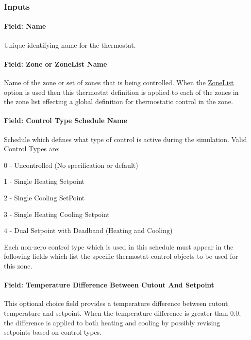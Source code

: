 \subsubsection{Inputs}\label{inputs-054}

\paragraph{Field: Name}\label{field-name-052}

Unique identifying name for the thermostat.

\paragraph{Field: Zone or ZoneList Name}\label{field-zone-or-zonelist-name-001}

Name of the zone or set of zones that is being controlled. When the \hyperref[zonelist]{ZoneList} option is used then this thermostat definition is applied to each of the zones in the zone list effecting a global definition for thermostatic control in the zone.

\paragraph{Field: Control Type Schedule Name}\label{field-control-type-schedule-name}

Schedule which defines what type of control is active during the simulation. Valid Control Types are:

0 - Uncontrolled (No specification or default)

1 - Single Heating Setpoint

2 - Single Cooling SetPoint

3 - Single Heating Cooling Setpoint

4 - Dual Setpoint with Deadband (Heating and Cooling)

Each non-zero control type which is used in this schedule must appear in the following fields which list the specific thermostat control objects to be used for this zone.

\paragraph{Field: Temperature Difference Between Cutout And Setpoint}\label{field-temperature-difference-between-cutout-and-Setpoint}

This optional choice field provides a temperature difference between cutout temperature and setpoint. When the temperature difference is greater than 0.0, the difference is applied to both heating and cooling by possibly revising setpoints based on control types.

